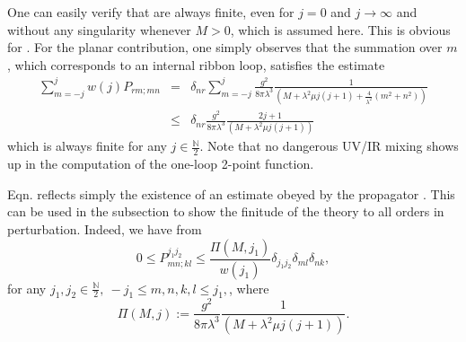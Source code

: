 \documentclass[10pt]{book}
\theoremstyle{break}
\begin{document}
One can easily verify that %
are always finite, even for $j=0$ and $j\to\infty$ and without any singularity whenever $M>0$, which is assumed here. This is obvious for %
. For the planar contribution, one simply observes that the summation over $m$, which corresponds to an internal ribbon loop, satisfies the estimate%
%
\begin{eqnarray}
\sum_{m=-j}^jw(j)P_{rm;mn}&=&\delta_{nr}\sum_{m=-j}^j\frac{g^2}{8\pi\lambda^3}\frac{1}{(M+\lambda^2\mu j(j+1)+\frac{4}{\lambda^2}(m^2+n^2))}\nonumber\\
&\le& \delta_{nr}\frac{g^2}{8\pi\lambda^3}\frac{2j+1}{(M+\lambda^2\mu j(j+1))} %
\end{eqnarray}
%
which is always finite for any $j\in\frac{\mathbb{N}}{2}$. Note that no dangerous UV/IR mixing shows up in the computation of the one-loop 2-point function.\par %

Eqn.%
reflects simply the existence of an estimate obeyed by the propagator %
. This can be used in the subsection %
to show the finitude of the theory to all orders in perturbation. Indeed, we have from %
\begin{equation}
0\le P^{j_1j_2}_{mn;kl}\le \frac{\Pi(M,j_1)}{w(j_1)}\delta_{j_1j_2}\delta_{ml}\delta_{nk}, %
\end{equation}
for any $j_1,j_2\in\frac{\mathbb{N}}{2},\ -j_1\le m,n,k,l\le j_1,$, where
\begin{equation}
\Pi(M,j) := \frac{g^2}{8\pi\lambda^3}\frac{1}{(M+\lambda^2\mu j(j+1))}.%
\end{equation}
\end{document}
